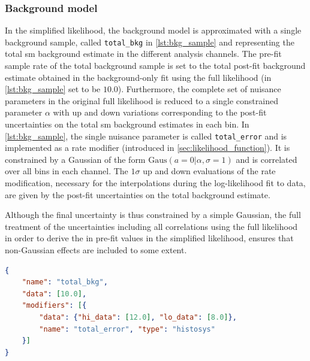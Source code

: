 \subsubsection{Background model}

In the simplified likelihood, the background model is approximated with a single background sample, called \texttt{total\_bkg} in \cref{lst:bkg_sample} and representing the total \gls{sm} background estimate in the different analysis channels.
The pre-fit sample rate of the total background sample is set to the total post-fit background estimate obtained in the background-only fit using the full likelihood (in \cref{lst:bkg_sample} set to be $10.0$).
Furthermore, the complete set of nuisance parameters in the original full likelihood is reduced to a single constrained parameter $\alpha$ with up and down variations corresponding to the post-fit uncertainties on the total \gls{sm} background estimates in each bin.
In \cref{lst:bkg_sample}, the single nuisance parameter is called \texttt{total\_error} and is implemented as a rate modifier (introduced in \cref{sec:likelihood_function}).
It is constrained by a Gaussian of the form $\mathrm{Gaus}(a = 0 \vert \alpha , \sigma = 1)$ and is correlated over all bins in each channel. The $1\sigma$ up and down evaluations of the rate modification, necessary for the interpolations during the log-likelihood fit to data, are given by the post-fit uncertainties on the total background estimate.

Although the final uncertainty is thus constrained by a simple Gaussian, the full treatment of the uncertainties including all correlations using the full likelihood in order to derive the in pre-fit values in the simplified likelihood, ensures that non-Gaussian effects are included to some extent.

\begin{minipage}{\linewidth}
\begin{lstlisting}[language=json,firstnumber=1,caption={Example of a total background sample with sample rate and total uncertainty as derived from a previous fit in the \glspl{sr} and \glspl{cr}. The `\textit{histosys}' type modifier in \lib{HistFactory} implements a shape uncertainty correlated over all bins.},captionpos=b, label=lst:bkg_sample]
{
	"name": "total_bkg",
	"data": [10.0],
	"modifiers": [{
		"data": {"hi_data": [12.0], "lo_data": [8.0]}, 
		"name": "total_error", "type": "histosys"
	}]
}
\end{lstlisting}
\end{minipage}

